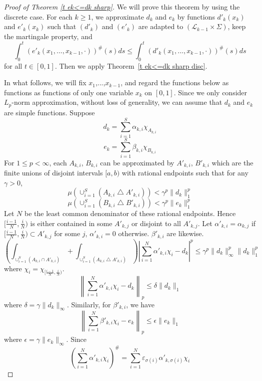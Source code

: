 \documentclass[12pt]{amsart}
\begin{document}
\begin{proof}[Proof of Theorem \ref{t ek<=dk sharp}]
We will prove this theorem by using the discrete case. For
each $k\geq 1$, we approximate
$d_k$ and $e_k$ by functions $d'_k(x_k)$ and
$e'_k(x_k)$ such that $(d'_k)$ and $(e'_k)$ are adapted
to $(\mathcal{L}_{k-1}\times\Sigma)$, keep the martingale
property, and 
\[\int_0^t (e'_k(x_1,...,x_{k-1},\cdot))^{\#}(s)ds \leq \int_0^t  (d'_k(x_1,...,x_{k-1},\cdot))^{\#}(s)ds\]
for all $t\in [0,1]$. Then we apply
Theorem~\ref{t ek<=dk sharp disc}.

In what follows, we will fix $x_1$,...,$x_{k-1}$, and regard the
functions below as functions as functions of only one variable $x_k$ on
$[0,1]$. Since we only consider
$L_p$-norm approximation, without loss of generality, we can
assume that $d_k$ and $e_k$ are simple functions. Suppose
\[d_k=\sum_{i=1}^S \alpha _{k,i}\chi _{A_{k,i}}\]
\[e_k=\sum_{i=1}^S \beta _{k,i}\chi _{B_{k,i}}\]
For $1\leq p<\infty$, each $A_{k,i}$, $B_{k,i}$ can be
approximated by $A'_{k,i}$, $B'_{k,i}$ which are the finite unions
of disjoint intervals $[a,b)$ with rational endpoints such that
for any $\gamma >0$,
\[\mu \left(\cup_{i=1}^S (A_{k,i}\bigtriangleup A'_{k,i})\right)< \gamma ^p \|d_k\|_1^p\]
\[\mu \left(\cup_{i=1}^S (B_{k,i}\bigtriangleup B'_{k,i})\right)< \gamma ^p \|e_k\|_1^p\]
Let $N$ be the least common denominator of these rational
endpoints. Hence $[\frac{i-1}{N},\frac{i}{N})$ is either contained
in some $A'_{k,j}$ or disjoint to all $A'_{k,j}$. Let
$\alpha'_{k,i}=\alpha_{k,j}$ if
$[\frac{i-1}{N},\frac{i}{N})\subset A'_{k,j}$ for some $j$,
$\alpha'_{k,i}=0$ otherwise. $\beta '_{k,i}$ are likewise.
\[\left(\int_{\cup _{i=1}^S (A_{k,i}\cap A'_{k,i})} +
 \int_{\cup _{i=1}^S (A_{k,i} \bigtriangleup A'_{k,i})}\right)
\left|\sum_{i=1}^N \alpha '_{k,i}\chi _i-d_k \right|^p \leq
\gamma^p \|d_k\|_\infty ^p \|d_k\|_1^p \] where $\chi _i=\chi
_{[\frac{i-1}{N},\frac{i}{N})}$.
\begin{equation}
\label{approx-1}
\left\|\sum_{i=1}^N \alpha' _{k,i}\chi _i-d_k \right\|_p \leq
\delta\|d_k\|_1
\end{equation}
where $\delta = \gamma \|d_k\|_\infty$. Similarly, for $\beta
'_{k,i}$, we have
\[\left\|\sum_{i=1}^N \beta' _{k,i}\chi _i-e_k \right\|_p \leq
\epsilon \|e_k\|_1  \] where $\epsilon = \gamma \|e_k\|_\infty$.
Since
\begin{equation}
\label{approx-2}
\left( \sum_{i=1}^N \alpha' _{k,i}\chi _i\right)^\# = \sum_{i=1}^N
\varepsilon_{\sigma (i)}\alpha' _{k,\sigma (i)}\chi _i
\end{equation}

\end{proof}
\end{document}
